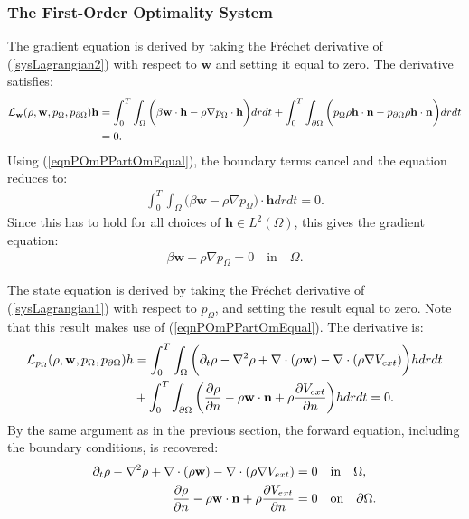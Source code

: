 \subsubsection{The First-Order Optimality System} \label{secOptimalityGradient1} \label{secOptimalityStateEqnDerivation1}
The gradient equation is derived by taking the Fr\'echet derivative of (\ref{sysLagrangian2}) with respect to $\mathbf{w}$ and setting it equal to zero. The derivative satisfies:
\begin{align*}
\mathcal{L}_{\mathbf{w}}(\rho,\mathbf{w}, p_\Omega, p_{\partial \Omega}) \mathbf{h} &= \int_0^T \int_\Omega  \bigg( \beta \mathbf{w} \cdot \mathbf{h} - \rho \nabla p_\Omega \cdot \mathbf{h} \bigg) dr dt   
 + \int_0^T \int_{\partial \Omega}  \bigg( p_\Omega \rho \mathbf{h} \cdot \mathbf{n} -  p_{\partial \Omega}\rho \mathbf{h} \cdot \mathbf{n}  \bigg) dr dt  \\ &=0 \notag.
\end{align*}
Using (\ref{eqnPOmPPartOmEqual}), the boundary terms cancel and the equation reduces to:
\begin{align*}
\int_0^T \int_\Omega \bigg( \beta \mathbf{w}  - \rho \nabla p_\Omega  \bigg)\cdot \mathbf{h} dr dt =0.
\end{align*}
Since this has to hold for all choices of $\mathbf{h} \in L^2(\Omega)$, this gives the gradient equation:
\begin{align}\label{eqnGradientEquation}
 \beta \mathbf{w} - \rho \nabla p_\Omega =0 \quad \text{in} \quad \Omega.
\end{align}

The state equation is derived by taking the Fr\'echet derivative of (\ref{sysLagrangian1}) with respect to $p_\Omega$, and setting the result equal to zero. Note that this result makes use of (\ref{eqnPOmPPartOmEqual}). The derivative is:
\begin{align*}
\mathcal{L}_{p_\Omega}(\rho,\mathbf{w}, p_\Omega, p_{\partial \Omega})h 
&=\int_0^T  \int_\Omega \bigg( \partial_t \rho - \nabla^2 \rho + \nabla \cdot (\rho \mathbf{w}) - \nabla \cdot (\rho \nabla V_{ext}) \bigg) h dr dt \notag \\ 
&+ \int_0^T \int_{\partial \Omega}  \bigg(\dfrac{\partial \rho}{\partial n} - \rho \mathbf{w}\cdot\mathbf{n} + \rho \dfrac{\partial V_{ext}}{\partial n}\bigg)h dr dt =0 \notag.
\end{align*}
By the same argument as in the previous section, the forward equation, including the boundary conditions, is recovered:
\begin{align}\label{sysForwardEquation} 
\partial_t \rho - \nabla^2 \rho + \nabla \cdot (\rho \mathbf{w}) - \nabla \cdot (\rho \nabla V_{ext}) &=0 \quad \text{in} \quad \Omega,\\ 
\dfrac{\partial \rho}{\partial n} - \rho \mathbf{w} \cdot \mathbf{n} + \rho \dfrac{\partial V_{ext}}{\partial n} &=0 \quad \text{on} \quad \partial \Omega \notag . 
\end{align}

